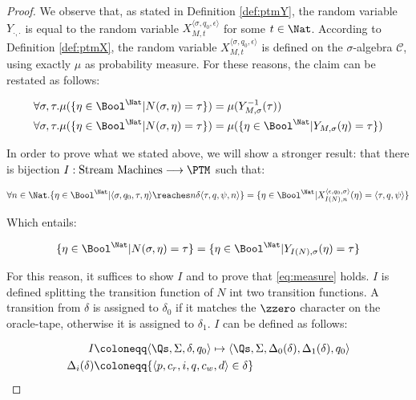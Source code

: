 \begin{proof}
We observe that, as stated in Definition \ref{def:ptmY}, the random variable
$Y_{\cdot, \cdot}$ is equal to the random variable
$X_{M, t}^{\langle \sigma, q_0, \epsilon\rangle}$ for some $t \in \Nat$.
According to Definition \ref{def:ptmX}, the random variable
$X_{M, t}^{\langle \sigma, q_0, \epsilon\rangle}$ is defined on the $\sigma$-algebra
$\mathcal C$, using exactly $\mu$ as probability measure.
%
For these reasons, the claim can be restated as follows:

\begin{align*}
\forall \sigma, \tau.\mu(\{\eta \in \Bool^\Nat| N(\sigma, \eta)= \tau\})&=\mu(Y_{M, \sigma}^{-1}(\tau))\\
\forall \sigma, \tau.\mu(\{\eta \in \Bool^\Nat| N(\sigma, \eta)= \tau\})&=\mu(\{\eta \in \Bool^\Nat| Y_{M,\sigma} (\eta) = \tau\})
\end{align*}

In order to prove what we stated above,
we will show a stronger result: that there is bijection $I: \text{Stream Machines} \longrightarrow \PTM$ such that:

\begin{equation}
\label{eq:measure}
\forall n \in \Nat.\{\eta \in \Bool^\Nat| \langle \sigma, q_0, \tau, \eta\rangle  \reaches n \delta \langle \tau, q, \psi, n\rangle \} = \{\eta \in \Bool^\Nat| X_{I(N), n}^{\langle \epsilon, q_0, \sigma\rangle} (\eta)= {\langle \tau, q, \psi\rangle}\}
\end{equation}

Which entails:

\begin{equation}
\label{eq:measurecons}
\{\eta \in \Bool^\Nat| N(\sigma, \eta)= \tau\} = \{\eta \in \Bool^\Nat| Y_{I(N),\sigma} (\eta) = \tau\}
\end{equation}

For this reason, it suffices to show $I$ and to prove that \ref{eq:measure} holds.
$I$ is defined splitting the transition function of $N$ int two
transition functions. A transition from $\delta$ is assigned to $\delta_0$
if it matches the $\zzero$ character on the oracle-tape, otherwise it
is assigned to $\delta_1$.
%
$I$ can be defined as follows:

\begin{align*}
I &\coloneqq \langle \Qs, \Sigma, \delta, q_0 \rangle \mapsto \langle \Qs, \Sigma, \Delta_0(\delta),\Delta_1(\delta), q_0 \rangle\\
\Delta_i(\delta) &\coloneqq \{\langle p, c_r, i, q, c_w, d \rangle \in \delta \}
\end{align*}


\end{proof}
